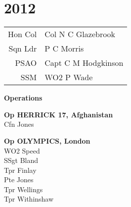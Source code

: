 \chapter*{2012}

\vspace*{20mm}

\begin{center}
  \begin{tabular}{rl}
    Hon Col & Col N C Glazebrook \\
    Sqn Ldr & P C Morris \\
    PSAO & Capt C M Hodgkinson \\
    SSM & WO2 P Wade \\
  \end{tabular}
\end{center}

\vspace*{20mm}

\begin{center}
  \Large
  \textbf{Operations}
\end{center}

\begin{multicols}{2}
  \noindent
  \textbf{Op HERRICK 17, Afghanistan} \\
  Cfn Jones \\

  \columnbreak
  
  \noindent
  \textbf{Op OLYMPICS, London} \\
  WO2 Speed \\
  SSgt Bland \\
  Tpr Finlay \\
  Pte Jones \\
  Tpr Wellings \\
  Tpr Withinshaw \\
\end{multicols}
